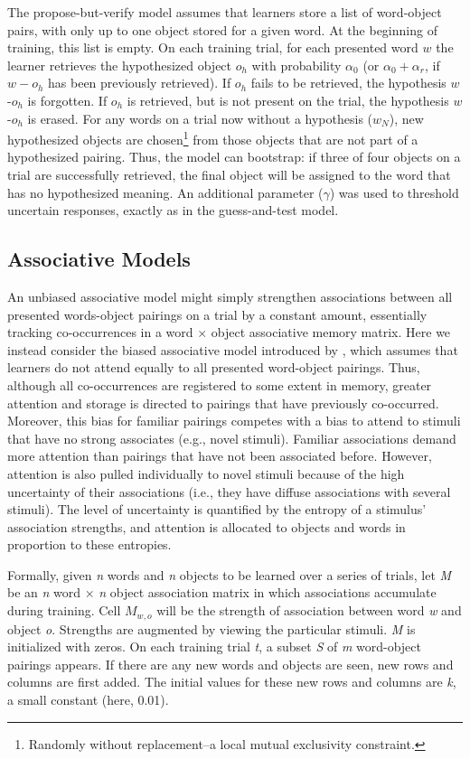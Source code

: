 \documentclass[man,floatsintext]{apa6}
\begin{document}
The propose-but-verify model assumes that learners store a list of word-object pairs, with only up to one object stored for a given word. At the beginning of training, this list is empty. On each training trial, for each presented word $w$ the learner retrieves the hypothesized object $o_h$ with probability $\alpha_0$ (or $\alpha_0 + \alpha_r$, if $w-o_h$ has been previously retrieved). If $o_h$ fails to be retrieved, the hypothesis $w$-$o_h$ is forgotten. If $o_h$ is retrieved, but is not present on the trial, the hypothesis $w$-$o_h$ is erased. For any words on a trial now without a hypothesis ($w_N$), new hypothesized objects are chosen\footnote{Randomly without replacement--a local mutual exclusivity constraint.} from those objects that are not part of a hypothesized pairing. Thus, the model can bootstrap: if three of four objects on a trial are successfully retrieved, the final object will be assigned to the word that has no hypothesized meaning. 
An additional parameter ($\gamma$) was used to threshold uncertain responses, exactly as in the guess-and-test model. 


\subsection{Associative Models}

An unbiased associative model might simply strengthen associations between all presented words-object pairings on a trial by a constant amount, essentially tracking co-occurrences in a word $\times$ object associative memory matrix. Here we instead consider the biased associative model introduced by \cite{Kachergis:2012gi}, which assumes that learners do not attend equally to all presented word-object pairings. Thus, although all co-occurrences are registered to some extent in memory, greater attention and storage is directed to pairings that have previously co-occurred. Moreover, this bias for familiar pairings competes with a bias to attend to stimuli that have no strong associates (e.g., novel stimuli). Familiar associations demand more attention than pairings that have not been associated before. However, attention is also pulled individually to novel stimuli because of the high uncertainty of their associations (i.e., they have diffuse associations with several stimuli). The level of uncertainty is quantified by the entropy of a stimulus' association strengths, and attention is allocated to objects and words in proportion to these entropies.

Formally, given \textit{n} words and \textit{n} objects to be learned over a series of trials, let \textit{M} be an \textit{n} word $\times$ \textit{n} object association matrix in which associations accumulate during training. Cell $M_{w,o}$ will be the strength of association between word \textit{w} and object \textit{o}. Strengths are augmented by viewing the particular stimuli. \textit{M} is initialized with zeros. On each training trial \textit{t}, a subset \textit{S} of \textit{m} word-object pairings appears. If there are any new words and objects are seen, new rows and columns are first added. The initial values for these new rows and columns are \textit{k}, a small constant (here, 0.01). 
\end{document}
